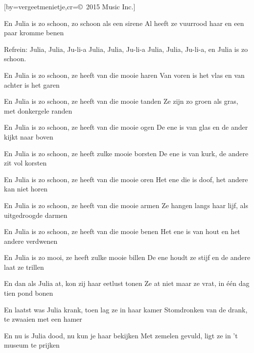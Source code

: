 

[by=vergeetmenietje,cr={\copyright~2015 Music Inc.}]


\chordsoff{}

\beginverse
    En Julia is zo schoon, zo schoon als een sirene
    Al heeft ze vuurrood haar en een paar kromme benen
\endverse

\beginverse
        Refrein:
        Julia, Julia, Ju-li-a
        Julia, Julia, Ju-li-a
        Julia, Julia, Ju-li-a, en Julia is zo schoon.
\endverse

\beginverse

    En Julia is zo schoon, ze heeft van die mooie haren
    Van voren is het vlas en van achter is het garen
\endverse

\beginverse
    En Julia is zo schoon, ze heeft van die mooie tanden
    Ze zijn zo groen als gras, met donkergele randen
\endverse

\beginverse
    En Julia is zo schoon, ze heeft van die mooie ogen
    De ene is van glas en de ander kijkt naar boven
\endverse

\beginverse
    En Julia is zo schoon, ze heeft zulke mooie borsten
    De ene is van kurk, de andere zit vol korsten
\endverse

\beginverse
    En Julia is zo schoon, ze heeft van die mooie oren
    Het ene die is doof, het andere kan niet horen
\endverse

\beginverse
    En Julia is zo schoon, ze heeft van die mooie armen
    Ze hangen langs haar lijf, als uitgedroogde darmen
\endverse

\beginverse
    En Julia is zo schoon, ze heeft van die mooie benen
    Het ene is van hout en het andere verdwenen
\endverse

\beginverse
    En Julia is zo mooi, ze heeft zulke mooie billen
    De ene houdt ze stijf en de andere laat ze trillen
\endverse

\beginverse
    En dan als Julia at, kon zij haar eetlust tonen
    Ze at niet maar ze vrat, in één dag tien pond bonen
\endverse

\beginverse
    En laatst was Julia krank, toen lag ze in haar kamer
    Stomdronken van de drank, te zwaaien met een hamer
\endverse

\beginverse
    En nu is Julia dood, nu kun je haar bekijken
    Met zemelen gevuld, ligt ze in 't museum te prijken
\endverse




\endsong
